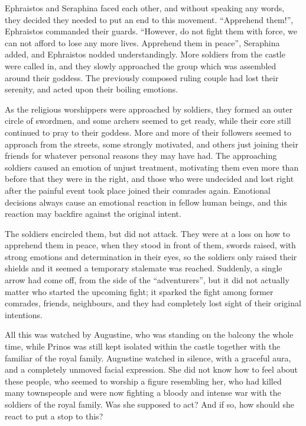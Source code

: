 Ephraistos and Seraphina faced each other, and without speaking any words, they decided they needed to put an end to this movement. \enquote{Apprehend them!}, Ephraistos commanded their guards. \enquote{However, do not fight them with force, we can not afford to lose any more lives. Apprehend them in peace}, Seraphina added, and Ephraistos nodded understandingly. More soldiers from the castle were called in, and they slowly approached the group which was assembled around their goddess. The previously composed ruling couple had lost their serenity, and acted upon their boiling emotions.

As the religious worshippers were approached by soldiers, they formed an outer circle of swordmen, and some archers seemed to get ready, while their core still continued to pray to their goddess. More and more of their followers seemed to approach from the streets, some strongly motivated, and others just joining their friends for whatever personal reasons they may have had. The approaching soldiers caused an emotion of unjust treatment, motivating them even more than before that they were in the right, and those who were undecided and lost right after the painful event took place joined their comrades again. Emotional decisions always cause an emotional reaction in fellow human beings, and this reaction may backfire against the original intent.

The soldiers encircled them, but did not attack. They were at a loss on how to apprehend them in peace, when they stood in front of them, swords raised, with strong emotions and determination in their eyes, so the soldiers only raised their shields and it seemed a temporary stalemate was reached. Suddenly, a single arrow had come off, from the side of the \enquote{adventurers}, but it did not actually matter who started the upcoming fight; it sparked the fight among former comrades, friends, neighbours, and they had completely lost sight of their original intentions.

All this was watched by Augustine, who was standing on the balcony the whole time, while Prinos was still kept isolated within the castle together with the familiar of the royal family. Augustine watched in silence, with a graceful aura, and a completely unmoved facial expression. She did not know how to feel about these people, who seemed to worship a figure resembling her, who had killed many townspeople and were now fighting a bloody and intense war with the soldiers of the royal family. Was she supposed to act? And if so, how should she react to put a stop to this?


